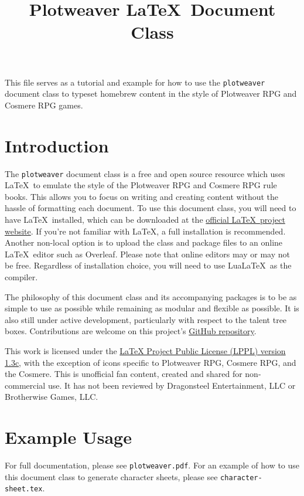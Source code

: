 \documentclass[article,stormlight,timeline,statblock]{plotweaver}
\title{Plotweaver \LaTeX~Document Class}
\author{}
\date{}
\begin{document}
\maketitle

This file serves as a tutorial and example for how to use the \texttt{plotweaver} document class to typeset homebrew content in the style of Plotweaver RPG and Cosmere RPG games.

\section{Introduction}
The \texttt{plotweaver} document class is a free and open source resource which uses \LaTeX~to emulate the style of the Plotweaver RPG and Cosmere RPG rule books. This allows you to focus on writing and creating content without the hassle of formatting each document. To use this document class, you will need to have \LaTeX~installed, which can be downloaded at the \href{https://www.latex-project.org/}{official \LaTeX~project website}. If you're not familiar with \LaTeX, a full installation is recommended. Another non-local option is to upload the class and package files to an online \LaTeX~editor such as Overleaf. Please note that online editors may or may not be free. Regardless of installation choice, you will need to use Lua\LaTeX~as the compiler.

The philosophy of this document class and its accompanying packages is to be as simple to use as possible while remaining as modular and flexible as possible. It is also still under active development, particularly with respect to the talent tree boxes. Contributions are welcome on this project's \href{https://github.com/teawizardry/plotweaver}{GitHub repository}. 

This work is licensed under the \href{https://latex-project.org/lppl/lppl-1-3c/}{LaTeX Project Public License (LPPL) version 1.3c}, with the exception of icons specific to Plotweaver RPG, Cosmere RPG, and the Cosmere. This is unofficial fan content, created and shared for non-commercial use. It has not been reviewed by Dragonsteel Entertainment, LLC or Brotherwise Games, LLC. 

\section{Example Usage}
For full documentation, please see \texttt{plotweaver.pdf}. For an example of how to use this document class to generate character sheets, please see \texttt{character-sheet.tex}. 
\end{document}
